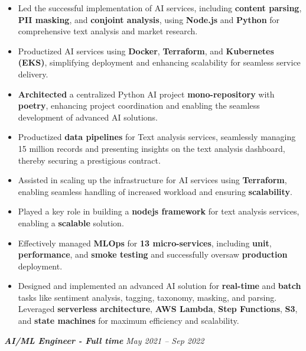 \documentclass[10pt,a4paper]{article}
\begin{document}
\begin{itemize}[leftmargin=1.2em, label=\textopenbullet]
  \item Led the successful implementation of AI services, including \textbf{content parsing}, \textbf{PII masking}, and \textbf{conjoint analysis}, using \textbf{Node.js} and \textbf{Python} for comprehensive text analysis and market research.
  \item Productized AI services using \textbf{Docker}, \textbf{Terraform}, and \textbf{Kubernetes (EKS)}, simplifying deployment and enhancing scalability for seamless service delivery.
  \item \textbf{Architected} a centralized Python AI project \textbf{mono-repository} with \textbf{poetry}, enhancing project coordination and enabling the seamless development of advanced AI solutions.
  \item Productized \textbf{data pipelines} for Text analysis services, seamlessly managing 15 million records and presenting insights on the text analysis dashboard, thereby securing a prestigious contract.
  \item Assisted in scaling up the infrastructure for AI services using \textbf{Terraform}, enabling seamless handling of increased workload and ensuring \textbf{scalability}.
  \item Played a key role in building a \textbf{nodejs framework} for text analysis services, enabling a \textbf{scalable} solution.
  \item Effectively managed \textbf{MLOps} for \textbf{13 micro-services}, including \textbf{unit}, \textbf{performance}, and \textbf{smoke testing} and successfully oversaw \textbf{production} deployment.
  \item Designed and implemented an advanced AI solution for \textbf{real-time} and \textbf{batch} tasks like sentiment analysis, tagging, taxonomy, masking, and parsing. Leveraged \textbf{serverless architecture}, \textbf{AWS Lambda}, \textbf{Step Functions}, \textbf{S3}, and \textbf{state machines} for maximum efficiency and scalability.
\end{itemize}

\vspace{2pt}
\noindent\textit{\textbf{AI/ML Engineer - Full time}} \hfill \textit{May 2021 -- Sep 2022}
\end{document}
